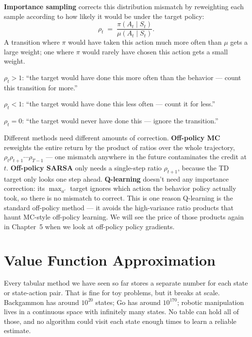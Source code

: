 \documentclass[11pt, oneside]{book}
\begin{document}
\textbf{Importance sampling} corrects this distribution mismatch by reweighting each
sample according to how likely it would be under the target policy:
\[
  \rho_t \;=\; \frac{\pi(A_t \mid S_t)}{\mu(A_t \mid S_t)}.
\]
A transition where $\pi$ would have taken this action much more often than $\mu$
gets a large weight; one where $\pi$ would rarely have chosen this action gets a small
weight.

\begin{intbox}[title={Reading the importance ratio}]
$\rho_t > 1$: ``the target would have done this more often than the behavior --- count
this transition for more.''

$\rho_t < 1$: ``the target would have done this less often --- count it for less.''

$\rho_t = 0$: ``the target would never have done this --- ignore the transition.''
\end{intbox}

Different methods need different amounts of correction.
\textbf{Off-policy MC} reweights the entire return by the product of ratios over the
whole trajectory, $\rho_t \rho_{t+1} \cdots \rho_{T-1}$ --- one mismatch anywhere in
the future contaminates the credit at $t$.
\textbf{Off-policy SARSA} only needs a single-step ratio $\rho_{t+1}$, because the
TD target only looks one step ahead.
\textbf{Q-learning} doesn't need any importance correction: its $\max_{a'}$ target
ignores which action the behavior policy actually took, so there is no mismatch to
correct.
This is one reason Q-learning is the standard off-policy method --- it avoids the
high-variance ratio products that haunt MC-style off-policy learning. We will see
the price of those products again in Chapter~5 when we look at off-policy policy
gradients.


\chapter{Value Function Approximation}

Every tabular method we have seen so far stores a separate number for each
state or state-action pair.
That is fine for toy problems, but it breaks at scale.
Backgammon has around $10^{20}$ states; Go has around $10^{170}$; robotic
manipulation lives in a continuous space with infinitely many states.
No table can hold all of those, and no algorithm could visit each state enough
times to learn a reliable estimate.
\end{document}
